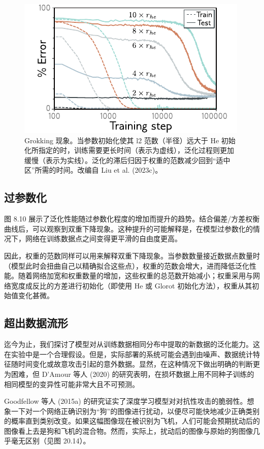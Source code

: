 \documentclass[lang=cn,newtx,10pt,scheme=chinese]{elegantbook}
\begin{document}
\begin{figure}[ht!]
\centering
\includegraphics[width=0.7\linewidth]{PDFFigures/UDLChap21PDF/WhyOmniGrok3.pdf}
\caption{Grokking 现象。当参数初始化使其 l2 范数（半径）远大于 He 初始化所指定的时，训练需要更长时间（表示为虚线），泛化过程则更加缓慢（表示为实线）。泛化的滞后归因于权重的范数减少回到“适中区”所需的时间。改编自 Liu et al. (2023c)。}
\end{figure}

\subsection{过参数化}
图 8.10 展示了泛化性能随过参数化程度的增加而提升的趋势。结合偏差/方差权衡曲线后，可以观察到双重下降现象。这种提升的可能解释是，在模型过参数化的情况下，网络在训练数据点之间变得更平滑的自由度更高。

因此，权重的范数同样可以用来解释双重下降现象。当参数数量接近数据点数量时（模型此时会扭曲自己以精确拟合这些点），权重的范数会增大，进而降低泛化性能。随着网络加宽和权重数量的增加，这些权重的总范数开始减小；权重采用与网络宽度成反比的方差进行初始化（即使用 He 或 Glorot 初始化方法），权重从其初始值变化甚微。

\subsection{超出数据流形}
迄今为止，我们探讨了模型对从训练数据相同分布中提取的新数据的泛化能力。这在实验中是一个合理假设。但是，实际部署的系统可能会遇到由噪声、数据统计特征随时间变化或故意攻击引起的意外数据。显然，在这种情况下做出明确的判断更为困难，但 D’Amour 等人 (2020) 的研究表明，在损坏数据上用不同种子训练的相同模型的变异性可能非常大且不可预测。

Goodfellow 等人 (2015a) 的研究证实了深度学习模型对对抗性攻击的脆弱性。想象一下对一个网络正确识别为“狗”的图像进行扰动，以便尽可能快地减少正确类别的概率直到类别改变。如果这幅图像现在被识别为飞机，人们可能会预期扰动后的图像看上去是狗和飞机的混合物。然而，实际上，扰动后的图像与原始的狗图像几乎毫无区别（见图 20.14）。
\end{document}
